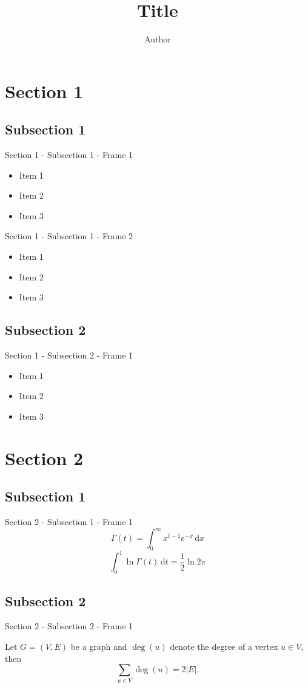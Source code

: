 \documentclass[compress]{beamer}
\title{Title}
\author{Author}
\institute{Institution}
\begin{document}
  \begin{frame}[plain]
    \titlepage
  \end{frame}

  \section{Section 1}
  \subsection{Subsection 1}
  \begin{frame}{Section 1 - Subsection 1 - Frame 1}
    \begin{itemize}
      \item Item 1
      \item Item 2
      \item Item 3
    \end{itemize}
  \end{frame}
  \begin{frame}{Section 1 - Subsection 1 - Frame 2}
    \begin{itemize}
      \item Item 1
      \item Item 2
      \item Item 3
    \end{itemize}
  \end{frame}
  \subsection{Subsection 2}
  \begin{frame}{Section 1 - Subsection 2 - Frame 1}
    \begin{itemize}
      \item Item 1
      \item Item 2
      \item Item 3
    \end{itemize}
  \end{frame}

  \section{Section 2}
  \subsection{Subsection 1}
  \begin{frame}{Section 2 - Subsection 1 - Frame 1}
    $$\Gamma(t) = \int_0^\infty x^{t-1} e^{-x}\, \mathrm{d} x$$
    $$\int_0^1 \ln \Gamma(t)\, \mathrm{d} t = \frac{1}{2}\ln 2\pi$$
  \end{frame}
  \subsection{Subsection 2}
  \begin{frame}{Section 2 - Subsection 2 - Frame 1}
    \begin{theorem}
      Let $G = (V,E)$ be a graph and $\deg(u)$ denote the degree of a vertex $u \in V$, then $$\sum_{u \in V} \deg(u) = 2 \vert E \vert.$$
    \end{theorem}
  \end{frame}
\end{document}
